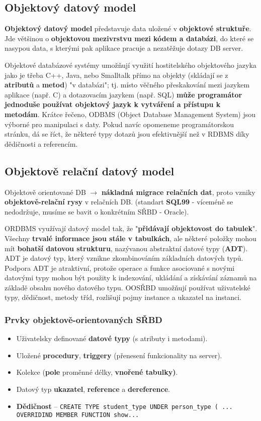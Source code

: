 \subsection{Objektový datový model}
\textbf{Objektový datový model} představuje data uložené v \textbf{objektové struktuře}. Jde většinou o \textbf{objektovou mezivrstvu mezi kódem a databázi}, do které se nasypou data, s kterými pak aplikace pracuje a nezatěžuje dotazy DB server.

Objektové databázové systémy umožňují využití hostitelského objektového jazyka jako je třeba C++, Java, nebo Smalltalk přímo na objekty (skládají se z \textbf{atributů} a \textbf{metod}) "v databázi"; tj. místo věčného přeskakování mezi jazykem aplikace (např. C) a dotazovacím jazykem (např. SQL) \textbf{může programátor jednoduše používat objektový jazyk k vytváření a přístupu k metodám}. Krátce řečeno, ODBMS (Object Database Management System) jsou výborné pro manipulaci s daty. Pokud navíc opomeneme programátorskou stránku, dá se říct, že některé typy dotazů jsou efektivnější než v RDBMS díky dědičnosti a referencím. 

\subsection{Objektově relační datový model}
Objektově orientované DB $\rightarrow$ \textbf{nákladná migrace relačních dat}, proto vzniky \textbf{objektově-relační rysy }v relačních DB. (standart \textbf{SQL99} - víceméně se nedodržuje, musíme se bavit o konkrétním SŘBD - Oracle).

ORDBMS využívají datový model tak, že "\textbf{přidávají objektovost do tabulek}". Všechny \textbf{trvalé informace jsou stále v tabulkách}, ale některé položky mohou mít \textbf{bohatší datovou strukturu}, nazývanou abstraktní datové typy (\textbf{ADT}). ADT je datový typ, který vznikne zkombinováním základních datových typů. Podpora ADT je atraktivní, protože operace a funkce asociované s novými datovými typy mohou být použity k indexování, ukládání a získávání záznamů na základě obsahu nového datového typu. OOSŘBD umožňují používat uživatelské typy, dědičnost, metody tříd, rozlišují pojmy instance a ukazatel na instanci. 

\subsubsection{Prvky objektově-orientovaných SŘBD}
\begin{itemize}
\item Uživatelsky definované \textbf{datové typy} (s atributy i metodami).
\item Uložené \textbf{procedury}, \textbf{triggery} (přenesení funkcionality na server).
\item Kolekce (\textbf{pole} proměnné délky, \textbf{vnořené tabulky)}.
\item Datový typ \textbf{ukazatel}, \textbf{reference} a \textbf{dereference}.
\item \textbf{Dědičnost} -- \texttt{CREATE TYPE student\_type UNDER person\_type ( ... OVERRIDIND MEMBER FUNCTION show...}
\end{itemize}

